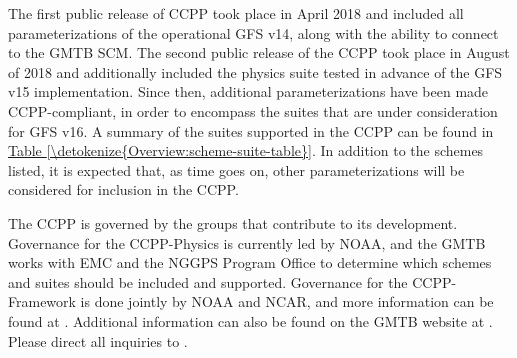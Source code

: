 \documentclass[letterpaper,10pt,english]{sphinxmanual}
\begin{document}
The first public release of CCPP took place in April 2018 and included all parameterizations
of the operational GFS v14, along with the ability to connect to the GMTB SCM.
The second public release of the CCPP took place in August of 2018 and additionally included
the physics suite tested in advance of the GFS v15 implementation.  Since then, additional
parameterizations have been made CCPP-compliant, in order to encompass the suites that are
under consideration for GFS v16.  A summary of the suites supported in the CCPP can be found
in \hyperref[\detokenize{Overview:scheme-suite-table}]{Table \ref{\detokenize{Overview:scheme-suite-table}}}.  In addition to the schemes listed, it is expected
that, as time goes on, other parameterizations will be considered for inclusion in the CCPP.

The CCPP is governed by the groups that contribute to its development.  Governance for the
CCPP-Physics is currently led by NOAA, and the GMTB works with EMC and the NGGPS Program Office
to determine which schemes and suites should be included and supported. Governance for the
CCPP-Framework is done jointly by NOAA and NCAR, and more information can be found at
. Additional information can also be found on
the GMTB website at . Please direct all inquiries to .
\end{document}

